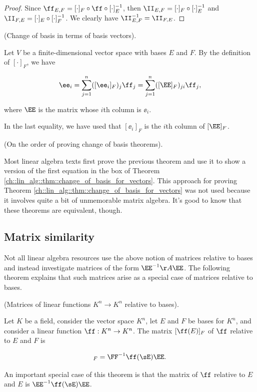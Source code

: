 \begin{proof}
    Since $\ff_{E,F} = [\cdot]_F \circ \ff \circ [\cdot]_E^{-1}$, then $\II_{E,F} = [\cdot]_F \circ [\cdot]_E^{-1}$ and $\II_{F,E} = [\cdot]_E \circ [\cdot]_F^{-1}$. We clearly have $\II_{E,F}^{-1} = \II_{F,E}$.
\end{proof}

\begin{theorem}
\label{ch::lin_alg::thm::change_of_basis_with_basis_vectors}
    (Change of basis in terms of basis vectors).
    
    Let $V$ be a finite-dimensional vector space with bases $E$ and $F$. By the definition of $[\cdot]_F$, we have
    
    \begin{align*}
        \ee_i = \sum_{j = 1}^n ([\ee_i]_F)_j \ff_j = \sum_{j = 1}^n ([\EE]_F)_{ji} \ff_j,
    \end{align*}
    
    where $\EE$ is the matrix whose $i$th column is $\ee_i$.
    
    In the last equality, we have used that $[\ee_i]_F$ is the $i$th column of $[\EE]_F$.
\end{theorem}

\begin{remark}
    (On the order of proving change of basis theorems). 
    
    Most linear algebra texts first prove the previous theorem and use it to show a version of the first equation in the box of Theorem \ref{ch::lin_alg::thm::change_of_basis_for_vectors}. This approach for proving Theorem \ref{ch::lin_alg::thm::change_of_basis_for_vectors} was not used because it involves quite a bit of unmemorable matrix algebra. It's good to know that these theorems are equivalent, though.
\end{remark}

\newpage

\subsection*{Matrix similarity}

Not all linear algebra resources use the above notion of matrices relative to bases and instead investigate matrices of the form $\EE^{-1} \AA \EE$. The following theorem explains that such matrices arise as a special case of matrices relative to bases.

\begin{theorem}
    (Matrices of linear functions $K^n \rightarrow K^n$ relative to bases).
    
    Let $K$ be a field, consider the vector space $K^n$, let $E$ and $F$ be bases for $K^n$, and consider a linear function $\ff:K^n \rightarrow K^n$. The matrix $[\ff(E)]_F$ of $\ff$ relative to $E$ and $F$ is
    
    \begin{align*}
        [\ff(E)]_F = \FF^{-1} \ff(\sE) \EE.
    \end{align*}

    An important special case of this theorem is that the matrix of $\ff$ relative to $E$ and $E$ is $\EE^{-1} \ff(\sE) \EE$.
\end{theorem}

